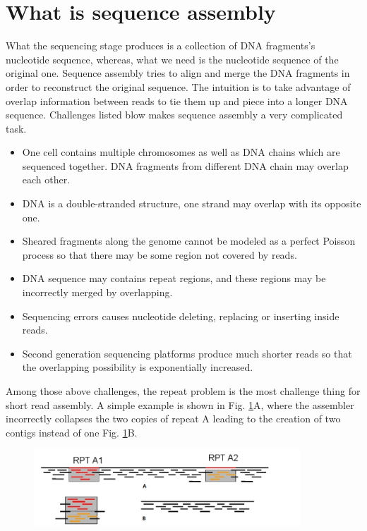 \documentclass{article}
\begin{document}
\section{What is sequence assembly}
What the sequencing stage produces is a collection of DNA fragments's nucleotide sequence, whereas, what we need is the nucleotide sequence of the original one. Sequence assembly tries to align and merge the DNA fragments in order to reconstruct the original sequence. The intuition is to take advantage of overlap information between reads to tie them up and piece into a longer DNA sequence. Challenges listed blow makes sequence assembly a very complicated task.\\
\begin{itemize}
 \item One cell contains multiple chromosomes as well as DNA chains which are sequenced together. DNA fragments from different DNA chain may overlap each other.
 \item DNA is a double-stranded structure, one strand may overlap with its opposite one.
 \item Sheared fragments along the genome cannot be modeled as a perfect Poisson process so that there may be some region not covered by reads.
 \item DNA sequence may contains repeat regions, and these regions may be incorrectly merged by overlapping.
 \item Sequencing errors causes nucleotide deleting, replacing or inserting inside reads.
 \item Second generation sequencing platforms produce much shorter reads so that the overlapping possibility is exponentially increased.
\end{itemize}
Among those above challenges, the repeat problem is the most challenge thing for short read assembly. A simple example is shown in Fig. \ref{repeat_example}A, where the assembler incorrectly collapses the two copies of repeat A leading to the creation of two contigs instead of one Fig. \ref{repeat_example}B.\\
\begin{figure}[ht]
  \centering
  \includegraphics[width=10cm]{Figure4.jpg}\\
  \caption{}\label{repeat_example}
\end{figure}
\end{document}

